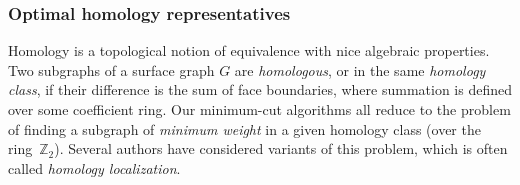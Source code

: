 \documentclass[11pt,twoside]{article}
\def\Z{\mathbb{Z}}
\def\Real{\mathbb{R}}
\begin{document}
%
%

\subsubsection*{Optimal homology representatives}

Homology is a topological notion of equivalence with nice algebraic properties.  Two subgraphs of a surface graph $G$ are \emph{homologous}, or in the same \emph{homology class}, if their difference is the sum of face boundaries, where summation is defined over some coefficient ring.  Our minimum-cut algorithms all reduce to the problem of finding a subgraph of \emph{minimum weight} in a given homology class (over the ring~$\Z_2$).  Several  authors have considered variants of this problem, which is often called \emph{homology localization}.
\end{document}
